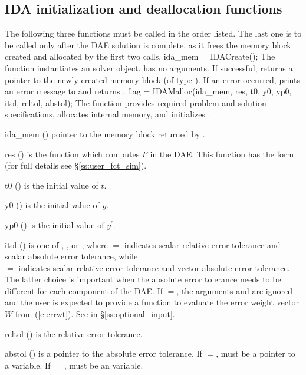 \subsection{IDA initialization and deallocation functions}
\label{sss:idamalloc}
The following three functions must be called in the order listed. The last one is to
be called only after the DAE solution is complete, as it frees the {\ida} memory
block created and allocated by the first two calls.
{
  ida\_mem = IDACreate();
}
{
  The function  instantiates an {\ida} solver object.
}
{
   has no arguments.
}
{
  If successful,  returns a pointer to the newly created 
  {\ida} memory block (of type ).
  If an error occurred,  prints an error message to 
  and returns .
}
{}
{
flag = IDAMalloc(ida\_mem, res, t0, y0, yp0, itol, reltol, abstol);
}
{
  The function  provides required problem and solution specifications, 
  allocates internal memory, and initializes {\ida}.
}
{
  \begin{args}
  \item[ida\_mem] ()
    pointer to the {\ida} memory block returned by .
  \item[res] ()
    is the {\C} function which computes $F$ in the DAE. This function has the form 
     (for full details see \S\ref{ss:user_fct_sim}).
  \item[t0] ()
    is the initial value of $t$.
  \item[y0] ()
    is the initial value of $y$. 
  \item[yp0] ()
    is the initial value of $y^\prime$. 
  \item[itol] () 
    is one of , , or , where $=$
    indicates scalar relative error 
    tolerance and scalar absolute error tolerance, while \\
    $=$
    indicates scalar relative error tolerance and vector absolute error tolerance. 
    The latter choice is important when the absolute error tolerance needs to
    be different for each component of the DAE. 
    If $=$, the arguments  and  are ignored
    and the user is expected to provide a function to evaluate the error weight vector
    $W$ from (\ref{e:errwt}). See  in \S\ref{ss:optional_input}.
  \item[reltol] ()
    is the relative error tolerance.
  \item[abstol] ()
    is a pointer to the absolute error tolerance. If $=$, 
    must be a pointer to a  variable. If $=$, 
    must be an  variable.
  \end{args}
}
